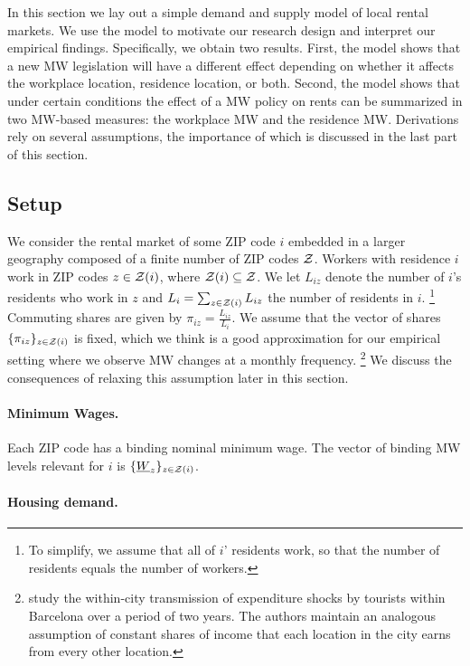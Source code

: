 
In this section we lay out a simple demand and supply model of local rental 
markets.
We use the model to motivate our research design and interpret our empirical
findings.
Specifically, we obtain two results.
First, the model shows that a new MW legislation will have a different effect 
depending on whether it affects the workplace location, residence location, or 
both.
Second, the model shows that under certain conditions the effect of a MW 
policy on rents can be summarized in two MW-based measures: 
the workplace MW and the residence MW.
Derivations rely on several assumptions, the importance of which is 
discussed in the last part of this section.

\subsection{Setup}

We consider the rental market of some ZIP code $i$ embedded in a larger geography 
composed of a finite number of ZIP codes $\mathcal{Z}$.
Workers with residence $i$ work in ZIP codes $z\in\mathcal{Z}(i)$, where 
$\mathcal{Z}(i)\subseteq\mathcal{Z}$.
We let $L_{iz}$ denote the number of $i$'s residents who work in $z$ and 
$L_i = \sum_{z \in \mathcal{Z}(i)} L_{iz}$ the number of residents in $i$.%
\footnote{To simplify, we assume that all of $i$' residents work, so that the 
number of residents equals the number of workers.}
Commuting shares are given by $\pi_{iz} = \frac{L_{iz}}{L_i}$.
We assume that the vector of shares $\{\pi_{iz}\}_{z\in\mathcal{Z}(i)}$ is fixed,
which we think is a good approximation for our empirical setting where we 
observe MW changes at a monthly frequency.%
\footnote{\textcite{AllenEtAl2020} study the within-city transmission of 
expenditure shocks by tourists within Barcelona over a period of two years.
The authors maintain an analogous assumption of constant shares of income that
each location in the city earns from every other location.}
We discuss the consequences of relaxing this assumption later in this section.

\paragraph{Minimum Wages.}

Each ZIP code has a binding nominal minimum wage.
The vector of binding MW levels relevant for $i$ is $\{\underline{W}_z\}_{z\in\mathcal{Z}(i)}$.

\paragraph{Housing demand.}

